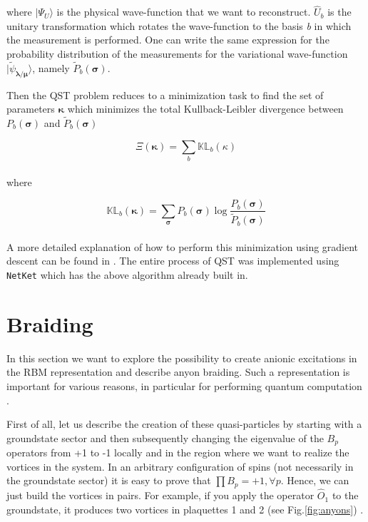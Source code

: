 \documentclass{article}
\begin{document}
where $|\Psi_{U}\rangle$ is the physical wave-function that we want to reconstruct. $\hat{U}_{b}$ is the unitary transformation which rotates the wave-function to the basis \textit{b} in which the measurement is performed. One can write the same expression for the probability distribution of the measurements for the variational wave-function $|\tilde \psi_{\boldsymbol{\lambda/\mu}}\rangle$, namely $\tilde P_{b}(\boldsymbol{\sigma})$.

Then the QST problem reduces to a minimization task to find the set of parameters $\boldsymbol{\kappa}$ which minimizes the total Kullback-Leibler divergence between $P_{b}(\boldsymbol{\sigma})$ and $\tilde P_{b}(\boldsymbol{\sigma})$

\begin{equation}\label{eq:19_4}
        \Xi(\boldsymbol{\kappa}) = \sum_{b} \mathbb{KL}_{b}({\kappa})
\end{equation}\\

where

\begin{equation}\label{eq:19_5}
        \mathbb{KL}_{b}({\boldsymbol{\kappa}}) = \sum_{\boldsymbol{\sigma}} P_{b}(\boldsymbol{\sigma}) \log \frac{ P_{b}(\boldsymbol{\sigma})}{\tilde P_{b}(\boldsymbol{\sigma})}
\end{equation}\\

A more detailed explanation of how to perform this minimization using gradient descent can be found in \cite{Torlai_2018}. The entire process of QST was implemented using \texttt{NetKet} \cite{netket:2019} which has the above algorithm already built in.

\section{Braiding}\label{sec4}

In this section we want to explore the possibility to create anionic excitations in the RBM representation and describe anyon braiding. Such a representation is important for various reasons, in particular for performing quantum computation \cite{Nayak_2008}. 

First of all, let us describe the creation of these quasi-particles by starting with a groundstate sector and then subsequently changing the eigenvalue of the $B_p$ operators from +1 to -1 locally and in the region where we want to realize the vortices in the system. 
In an arbitrary configuration of spins (not necessarily in the groundstate sector) it is easy to prove that $\prod B_p = +1 ,\forall p$. Hence, we can just build the vortices in pairs. For example, if you apply the operator $\hat{O}_1$ to the groundstate,  it produces two vortices in plaquettes 1 and 2 (see Fig.\hspace{0.2mm}\ref{fig:anyons}) \cite{Leggett} . 
\end{document}
